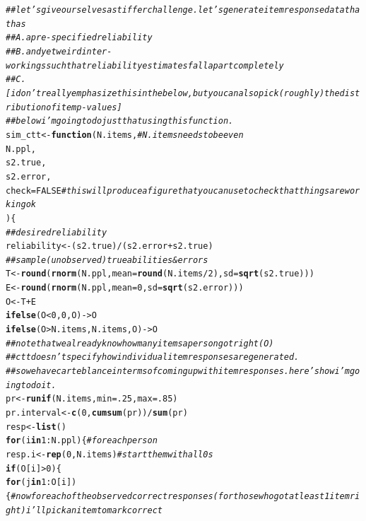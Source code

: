 \documentclass{article}\usepackage[]{graphicx}\usepackage[]{color}
\makeatletter
\newcommand{\hlnum}[1]{\textcolor[rgb]{0.686,0.059,0.569}{#1}}%
\newcommand{\hlcom}[1]{\textcolor[rgb]{0.678,0.584,0.686}{\textit{#1}}}%
\newcommand{\hlopt}[1]{\textcolor[rgb]{0,0,0}{#1}}%
\newcommand{\hlstd}[1]{\textcolor[rgb]{0.345,0.345,0.345}{#1}}%
\newcommand{\hlkwa}[1]{\textcolor[rgb]{0.161,0.373,0.58}{\textbf{#1}}}%
\newcommand{\hlkwb}[1]{\textcolor[rgb]{0.69,0.353,0.396}{#1}}%
\newcommand{\hlkwc}[1]{\textcolor[rgb]{0.333,0.667,0.333}{#1}}%
\newcommand{\hlkwd}[1]{\textcolor[rgb]{0.737,0.353,0.396}{\textbf{#1}}}%
\newenvironment{kframe}{%
 \def\at@end@of@kframe{}%
 \ifinner\ifhmode%
  \def\at@end@of@kframe{\end{minipage}}%
  \begin{minipage}{\columnwidth}%
 \fi\fi%
 \def\FrameCommand##1{\hskip\@totalleftmargin \hskip-\fboxsep
 \colorbox{shadecolor}{##1}\hskip-\fboxsep
     \hskip-\linewidth \hskip-\@totalleftmargin \hskip\columnwidth}%
 \MakeFramed {\advance\hsize-\width
   \@totalleftmargin\z@ \linewidth\hsize
   \@setminipage}}%
 {\par\unskip\endMakeFramed%
 \at@end@of@kframe}
\newenvironment{knitrout}{}{} %
\makeatother
\begin{document}
\begin{knitrout}
\begin{kframe}
\begin{alltt}
\hlcom{##let's give ourselves a stiffer challenge. let's generate item response data that has}
\hlcom{##A. a pre-specified reliability}
\hlcom{##B. and yet weird inter-workings such that reliability estimates fall apart completely}
\hlcom{##C. [i don't really emphasize this in the below, but you can also pick (roughly) the distribution of item p-values]}
\hlcom{##below i'm going to do just that using this function.}
\hlstd{sim_ctt}\hlkwb{<-}\hlkwa{function}\hlstd{(}\hlkwc{N.items}\hlstd{,} \hlcom{#N.items needs to be even}
                  \hlkwc{N.ppl}\hlstd{,}
                  \hlkwc{s2.true}\hlstd{,}
                  \hlkwc{s2.error}\hlstd{,}
                  \hlkwc{check}\hlstd{=}\hlnum{FALSE} \hlcom{#this will produce a figure that you can use to check that things are working ok}
                  \hlstd{) \{}
    \hlcom{##desired reliability}
    \hlstd{reliability}\hlkwb{<-}\hlstd{(s2.true)}\hlopt{/}\hlstd{(s2.error}\hlopt{+}\hlstd{s2.true)}
    \hlcom{##sample (unobserved) true abilities & errors}
    \hlstd{T}\hlkwb{<-}\hlkwd{round}\hlstd{(}\hlkwd{rnorm}\hlstd{(N.ppl,}\hlkwc{mean}\hlstd{=}\hlkwd{round}\hlstd{(N.items}\hlopt{/}\hlnum{2}\hlstd{),}\hlkwc{sd}\hlstd{=}\hlkwd{sqrt}\hlstd{(s2.true)))}
    \hlstd{E}\hlkwb{<-}\hlkwd{round}\hlstd{(}\hlkwd{rnorm}\hlstd{(N.ppl,}\hlkwc{mean}\hlstd{=}\hlnum{0}\hlstd{,}\hlkwc{sd}\hlstd{=}\hlkwd{sqrt}\hlstd{(s2.error)))}
    \hlstd{O}\hlkwb{<-}\hlstd{T}\hlopt{+}\hlstd{E}
    \hlkwd{ifelse}\hlstd{(O}\hlopt{<}\hlnum{0}\hlstd{,}\hlnum{0}\hlstd{,O)}\hlkwb{->}\hlstd{O}
    \hlkwd{ifelse}\hlstd{(O}\hlopt{>}\hlstd{N.items,N.items,O)}\hlkwb{->}\hlstd{O}
    \hlcom{##note that we already know how many items a person got right (O)}
    \hlcom{##ctt doesn't specify how individual item responses are generated.}
    \hlcom{##so we have carte blance in terms of coming up with item responses. here's how i'm going to do it. }
    \hlstd{pr}\hlkwb{<-}\hlkwd{runif}\hlstd{(N.items,}\hlkwc{min}\hlstd{=}\hlnum{.25}\hlstd{,}\hlkwc{max}\hlstd{=}\hlnum{.85}\hlstd{)}
    \hlstd{pr.interval}\hlkwb{<-}\hlkwd{c}\hlstd{(}\hlnum{0}\hlstd{,}\hlkwd{cumsum}\hlstd{(pr))}\hlopt{/}\hlkwd{sum}\hlstd{(pr)}
    \hlstd{resp}\hlkwb{<-}\hlkwd{list}\hlstd{()}
    \hlkwa{for} \hlstd{(i} \hlkwa{in} \hlnum{1}\hlopt{:}\hlstd{N.ppl) \{} \hlcom{#for each person}
        \hlstd{resp.i}\hlkwb{<-}\hlkwd{rep}\hlstd{(}\hlnum{0}\hlstd{,N.items)} \hlcom{#start them with all 0s}
        \hlkwa{if} \hlstd{(O[i]}\hlopt{>}\hlnum{0}\hlstd{) \{}
            \hlkwa{for} \hlstd{(j} \hlkwa{in} \hlnum{1}\hlopt{:}\hlstd{O[i]) \{} \hlcom{#now for each of the observed correct responses (for those who got at least 1 item right) i'll pick an item to mark correct}

\end{alltt}
\end{kframe}
\end{knitrout}
\end{document}
